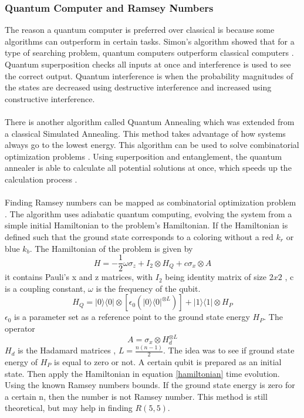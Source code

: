 \documentclass{Assignment}
\begin{document}
\subsubsection*{Quantum Computer and Ramsey Numbers}
The reason a quantum computer is preferred over classical is because some algorithms can outperform in certain tasks. 
Simon's algorithm showed that for a type of searching problem, quantum computers outperform classical computers \cite{doi:10.1137/S0097539796298637}.
Quantum superposition checks all inputs at once and interference is used to see the correct output.
Quantum interference is when the probability magnitudes of the states are decreased using destructive interference and increased using constructive interference.
\\\\
There is another algorithm called Quantum Annealing which was extended from a classical Simulated Annealing.
This method takes advantage of how systems always go to the lowest energy.
This algorithm can be used to solve combinatorial optimization problems \cite{AndrewSteane}.
Using superposition and entanglement, the quantum annealer is able to calculate all potential solutions at once, which speeds up the 
calculation process \cite{AndrewSteane}.
\\\\
Finding Ramsey numbers can be mapped as combinatorial optimization problem \cite{PhysRevA.93.032301}.
The algorithm uses adiabatic quantum computing, evolving the system from a simple initial Hamiltonian to the problem's Hamiltonian.
If the Hamiltonian is defined such that the ground state corresponds to a coloring without a red $k_r$ or blue $k_b$.
The Hamiltonian of the problem is given by
\begin{equation}
	H = -\frac{1}{2}\omega \sigma_z + I_2 \otimes H_Q+c\sigma_x\otimes A
	\label{hamiltonian}
\end{equation}
it contains Pauli's x and z matrices, with $I_2$ being identity matrix of size $2 x 2$ , c is a coupling constant, $\omega$ is the frequency of the qubit.
$$H_Q =|0\rangle\langle0|\otimes[\epsilon_0(|0\rangle\langle0|^{\otimes L})] + |1\rangle\langle 1|\otimes H_P$$
$\epsilon_0$ is a parameter set as a reference point to the ground state energy $H_P$.
The operator $$A = \sigma_x \otimes H_d^{\otimes L}$$
$H_d$ is the Hadamard matrices , $L = \frac{n(n-1)}{2}$.
The idea was to see if ground state energy of $H_P$ is equal to zero or not.
A certain qubit is prepared as an initial state.
Then apply the Hamiltonian in equation \eqref{hamiltonian} time evolution. 
Using the known Ramsey numbers bounds.
If the ground state energy is zero for a certain n, then the number is not Ramsey number. 
This method is still theoretical, but may help in finding $R(5,5)$.
\end{document}
